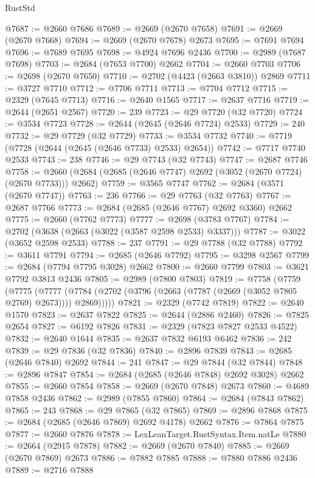 \begin{lexlean}{RustStd}
\begin{coremodule}
@7687 := @2660 @7686
@7689 := @2669 (@2670 @7658)
@7691 := @2669 (@2670 @7668)
@7694 := @2669 (@2670 @7678) @2673
@7695 := @7691 @7694
@7696 := @7689 @7695
@7698 := @4924 @7696 @2436
@7700 := @2989 (@7687 @7698)
@7703 := @2684 (@7653 @7700) @2662
@7704 := @2660 @7703
@7706 := @2698 (@2670 @7650)
@7710 := @2702 (@4423 (@2663 @3810)) @2869
@7711 := @3727 @7710
@7712 := @7706 @7711
@7713 := @7704 @7712
@7715 := @2329 (@7645 @7713)
@7716 := @2640 @1565
@7717 := @2637 @7716
@7719 := @2644 (@2651 @2567)
@7720 := 239
@7723 := @29 @7720 (@32 @7720)
@7724 := @3534 @7723
@7728 := @2644 (@2645 (@2646 @7724) @2533)
@7729 := 240
@7732 := @29 @7729 (@32 @7729)
@7733 := @3534 @7732
@7740 := @7719 (@7728 (@2644 (@2645 (@2646 @7733) @2533) @2654))
@7742 := @7717 @7740 @2533
@7743 := 238
@7746 := @29 @7743 (@32 @7743)
@7747 := @2687 @7746
@7758 := @2660 (@2684 (@2685 (@2646 @7747) @2692 (@3052 (@2670 @7724) (@2670 @7733))) @2662)
@7759 := @3565 @7747
@7762 := @2684 (@3571 (@2670 @7747))
@7763 := 236
@7766 := @29 @7763 (@32 @7763)
@7767 := @2687 @7766
@7773 := @2684 (@2685 (@2646 @7767) @2692 @3360) @2662
@7775 := @2660 (@7762 @7773)
@7777 := @2698 (@3783 @7767)
@7784 := @2702 (@3638 (@2663 (@3022 (@3587 @2598 @2533) @3337)))
@7787 := @3022 (@3652 @2598 @2533)
@7788 := 237
@7791 := @29 @7788 (@32 @7788)
@7792 := @3611 @7791
@7794 := @2685 (@2646 @7792)
@7795 := @3298 @2567
@7799 := @2684 (@7794 @7795 @3028) @2662
@7800 := @2660 @7799
@7803 := @3621 @7792 @3813 @2436
@7805 := @2989 (@7800 @7803)
@7819 := @7758
    (@7759
      (@7775
        (@7777 (@7784 (@2702 (@3796 (@2663 (@7787 (@2669 (@3052 @7805 @2769) @2673)))) @2869)))))
@7821 := @2329 (@7742 @7819)
@7822 := @2640 @1570
@7823 := @2637 @7822
@7825 := @2644 (@2886 @2460)
@7826 := @7825 @2654
@7827 := @6192 @7826
@7831 := @2329 (@7823 @7827 @2533 @4522)
@7832 := @2640 @1644
@7835 := @2637 @7832 @6193 @6462
@7836 := 242
@7839 := @29 @7836 (@32 @7836)
@7840 := @2896 @7839
@7843 := @2685 (@2646 @7840) @2692
@7844 := 241
@7847 := @29 @7844 (@32 @7844)
@7848 := @2896 @7847
@7854 := @2684 (@2685 (@2646 @7848) @2692 @3028) @2662
@7855 := @2660 @7854
@7858 := @2669 (@2670 @7848) @2673
@7860 := @4689 @7858 @2436
@7862 := @2989 (@7855 @7860)
@7864 := @2684 (@7843 @7862)
@7865 := 243
@7868 := @29 @7865 (@32 @7865)
@7869 := @2896 @7868
@7875 := @2684 (@2685 (@2646 @7869) @2692 @4178) @2662
@7876 := @7864 @7875
@7877 := @2660 @7876
@7878 := LexLeanTarget.RustSyntax.Item.natLe
@7880 := @2664 (@2915 @7878)
@7882 := @2669 (@2670 @7840)
@7885 := @2669 (@2670 @7869) @2673
@7886 := @7882 @7885
@7888 := @7880 @7886 @2436
@7889 := @2716 @7888

\end{coremodule}
\end{lexlean}
